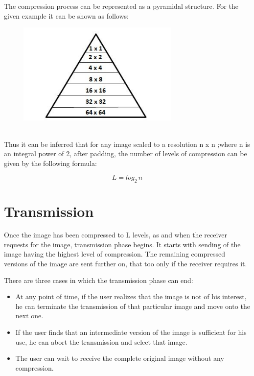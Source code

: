 \documentclass[twocolumn,12pt]{article}
\begin{document}
The compression process can be represented as a pyramidal structure. For the given example it can be shown as follows:
\begin{figure}[ht!]
\centering
\includegraphics[width=80mm]{tri.jpg}
\end{figure}\\

Thus it can be inferred that for any image scaled to a resolution n x n ;where n is an integral power of 2, after padding, the number of levels of compression can be given by the following formula:

\begin{displaymath}
L = log_2 \hspace{2pt} n
\end{displaymath}

\section{Transmission}
Once the image has been compressed to L levels, as and when the receiver requests for the image, transmission phase begins. It starts with sending of the image having the highest level of compression. The remaining compressed versions of the image are sent further on, that too only if the receiver requires it.

There are three cases in which the transmission phase can end:
\begin{itemize}
\item At any point of time, if the user realizes that the image is not of his interest, he can terminate the transmission of that particular image and move onto the next one.
\item If the user finds that an intermediate version of the image is sufficient for his use, he can abort the transmission and select that image.
\item The user can wait to receive the complete original image without any compression.
\end{itemize}
\end{document}
